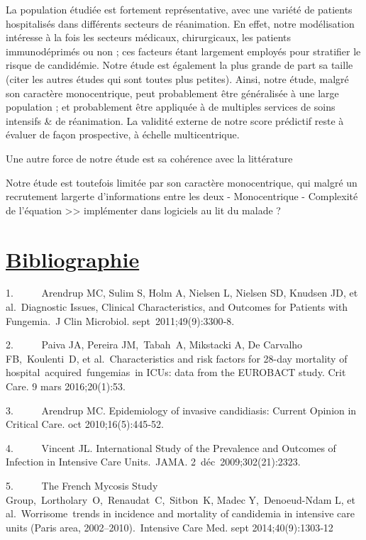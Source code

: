 \documentclass[
  french,
  letterpaper,
  DIV=11,
  numbers=noendperiod,
  justified]{scrartcl}
\begin{document}
La population étudiée est fortement représentative, avec une variété de
patients hospitalisés dans différents secteurs de réanimation. En effet,
notre modélisation intéresse à la fois les secteurs médicaux,
chirurgicaux, les patients immunodéprimés ou non ; ces facteurs étant
largement employés pour stratifier le risque de candidémie. Notre étude
est également la plus grande de part sa taille (citer les autres études
qui sont toutes plus petites). Ainsi, notre étude, malgré son caractère
monocentrique, peut probablement être généralisée à une large population
; et probablement être appliquée à de multiples services de soins
intensifs \& de réanimation. La validité externe de notre score
prédictif reste à évaluer de façon prospective, à échelle
multicentrique.

Une autre force de notre étude est sa cohérence avec la littérature

Notre étude est toutefois limitée par son caractère monocentrique, qui
malgré un recrutement largerte d'informations entre les deux -
Monocentrique - Complexité de l'équation \textgreater\textgreater{}
implémenter dans logiciels au lit du malade ?

\section{\texorpdfstring{\ul{Bibliographie}}{Bibliographie}}\label{bibliographie}

1.~~~~~ Arendrup MC, Sulim S, Holm A, Nielsen L, Nielsen SD, Knudsen JD,
et al.~Diagnostic Issues, Clinical Characteristics, and Outcomes for
Patients with Fungemia.~J Clin Microbiol. sept~2011;49(9):3300‑8.~

2.~~~~~ Paiva JA, Pereira JM,~Tabah~A, Mikstacki A, De Carvalho
FB,~Koulenti~D, et al.~Characteristics and risk factors for 28-day
mortality of hospital~acquired~fungemias~in ICUs: data from the EUROBACT
study. Crit Care. 9 mars 2016;20(1):53.~

3.~~~~~ Arendrup MC. Epidemiology of invasive candidiasis: Current
Opinion in Critical Care. oct 2010;16(5):445‑52.~

4.~~~~~ Vincent JL. International Study of the Prevalence and Outcomes
of Infection in Intensive Care Units.~JAMA. 2~déc~2009;302(21):2323.~

5.~~~~~ The French Mycosis Study
Group,~Lortholary~O,~Renaudat~C,~Sitbon~K, Madec Y,~Denoeud-Ndam L, et
al.~Worrisome~trends in incidence and mortality of candidemia in
intensive care units (Paris area, 2002--2010).~Intensive Care Med. sept
2014;40(9):1303‑12~
\end{document}
